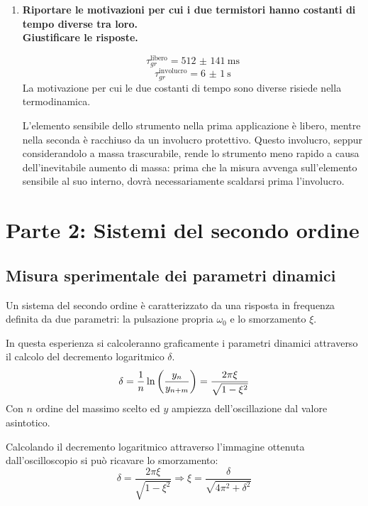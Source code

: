 \documentclass[a4paper, 12pt, twoside]{report}
\begin{document}
\begin{enumerate}
\newpage	

		\item \textbf{Riportare le motivazioni per cui i due termistori hanno costanti di tempo diverse tra loro. \\ Giustificare le risposte.} 
		
		\[\tau_{gr}^{\text{libero}} = \SI[separate-uncertainty = true]{512(141)}{\milli\second}\]		
		\[\tau_{gr}^{\text{involucro}} = \SI[separate-uncertainty = true]{6(1)}{\second}\]				
		La motivazione per cui le due costanti di tempo sono diverse risiede nella termodinamica. 
		
		L'elemento sensibile dello strumento nella prima applicazione è libero, mentre nella seconda è racchiuso da un involucro protettivo. Questo involucro, seppur considerandolo a massa trascurabile, rende lo strumento meno rapido a causa dell'inevitabile aumento di massa: prima che la misura avvenga sull'elemento sensibile al suo interno, dovrà necessariamente scaldarsi prima l'involucro.
		\end{enumerate}
	
\newpage	
	
		\section{Parte 2: Sistemi del secondo ordine} 
		\subsection{Misura sperimentale dei parametri dinamici}
		Un sistema del secondo ordine è caratterizzato da una risposta in frequenza definita da due parametri: la pulsazione propria $\omega_0$ e lo smorzamento $\xi$. \newline
		
		In questa esperienza si calcoleranno graficamente i parametri dinamici attraverso il calcolo del decremento logaritmico $\delta$.
		\[\delta = {1\over n}\ln\left(y_n\over y_{n+m}\right) = \dfrac{2\pi\xi}{\sqrt{1-\xi^2}}\]
		Con $n$ ordine del massimo scelto ed $y$ ampiezza dell'oscillazione dal valore asintotico. \newline 
		
		Calcolando il decremento logaritmico attraverso l'immagine ottenuta dall'oscilloscopio si può ricavare lo smorzamento: 
		\[\delta = \dfrac{2\pi\xi}{\sqrt{1-\xi^2}} \Rightarrow \xi = \dfrac{\delta}{\sqrt{4\pi^2 + \delta^2}}\]  
		
\end{document}
